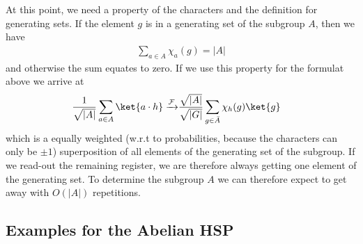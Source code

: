 At this point, we need a property of the characters and the definition for generating sets. If the element $g$ is in a generating set of the subgroup $A$, then we have
\begin{align}
    \sum_{a\in A} \chi_a(g) = |A|
\end{align}
and otherwise the sum equates to zero. 
If we use this property for the formulat above we arrive at
\begin{align}
    \frac{1}{\sqrt{|A|}} \sum_{a\in A} \ket{a\cdot h} \xrightarrow[]{\mathcal{F}} & \frac{\sqrt{|A|}}{\sqrt{|G|}} \sum_{g\in \bar{A}} \chi_h(g)\ket{g}
\end{align}
which is a equally weighted (w.r.t to probabilities, because the characters can only be $\pm 1$) superposition of all elements of the generating set of the subgroup. If we read-out the remaining register, we are therefore always getting one element of the generating set. To determine the subgroup $A$ we can therefore expect to get away with $O(|A|)$ repetitions.

\subsection{Examples for the Abelian HSP}
